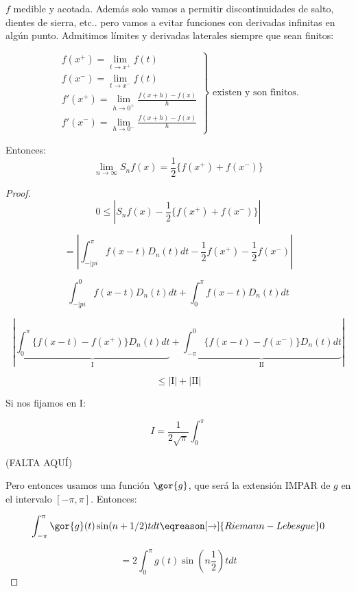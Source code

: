	\begin{theorem}[Dirichlet 2]

		$f$ medible y acotada. Además solo vamos a permitir discontinuidades de salto, dientes de sierra, etc.. pero vamos a evitar funciones con derivadas infinitas en algún punto. Admitimos límites y derivadas laterales siempre que sean finitos:


		\[
		\left.
		\begin{array}{l}
			f(x^+) = \lim_{t \to x^+} f(t) \\
			f(x^-) = \lim_{t \to x^-} f(t) \\
			f'(x^+) = \lim_{h \to 0^+} \frac{f(x+h)-f(x)}{h} \\
			f'(x^-) = \lim_{h \to 0^-} \frac{f(x+h)-f(x)}{h}
		\end{array} \right\} \text{ existen y son finitos.}
		\]

		Entonces: \[ \lim_{n \to \infty} S_nf(x) = \frac{1}{2} \{f(x^+)+f(x^-)\}\]

	\end{theorem}

	\begin{proof}

		\[ 0 \leq | S_n f(x) - \frac{1}{2} \{f(x^+) + f(x^-)\} |\]

		\[ = \left| \int_{-|pi}^\pi f(x-t) D_n (t) dt - \frac{1}{2} f(x^+)- \frac{1}{2} f(x^-) \right|  \]

		\[ \int_{-|pi}^{0} f(x-t) D_n(t)dt + \int_{0}^\pi f(x-t) D_n(t) dt \]

		\[ \left| \underbrace{\int_0^\pi  \{ f(x-t) - f(x^+) \} D_n(t) dt }_{\text{I}} + \underbrace{\int_{-\pi}^{0}  \{ f(x-t) - f(x^-) \} D_n(t) dt }_{\text{II}} \right| \]

		\[\leq | \text{I} | +  |\text{II}| \]

		Si nos fijamos en I:

		\[ I = \frac{1}{2\sqrt{\pi}} \int_{0}^\pi \]

		(FALTA AQUÍ)

		Pero entonces usamos una función $\gor{g}$, que será la extensión IMPAR de $g$ en el intervalo $[-\pi,\pi]$. Entonces:

		\[ \int_{-\pi}^\pi  \gor{g}(t) \sin(n+1/2)t dt \eqreason[\rightarrow]{Riemann-Lebesgue} 0 \]

		\[ = 2 \int_{0}^\pi g(t) \sin(n \frac{1}{2}) t dt \]


	\end{proof}


